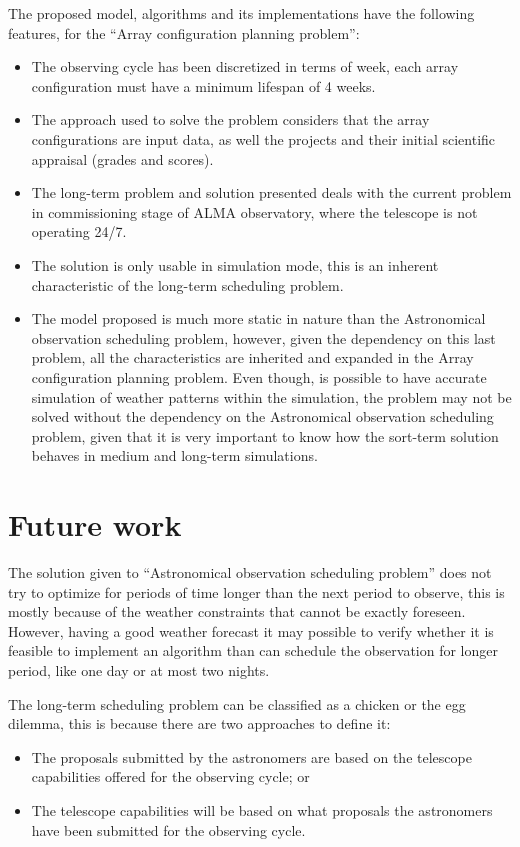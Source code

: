 The proposed model, algorithms and its implementations have the following features, for the ``Array configuration planning problem'':
\begin{itemize}
\item The observing cycle has been discretized in terms of week, each array configuration must have a minimum lifespan of 4 weeks.

\item The approach used to solve the problem considers that the array configurations are input data, as well the projects and their initial scientific appraisal (grades and scores).

\item The long-term problem and solution presented deals with the current problem in commissioning stage of ALMA observatory, where the telescope is not operating 24/7.

\item The solution is only usable in simulation mode, this is an inherent characteristic of the long-term scheduling problem.

\item The model proposed is much more static in nature than the Astronomical observation scheduling problem, however, given the dependency on this last problem, all the characteristics are inherited and expanded in the Array configuration planning problem. Even though, is possible to have accurate simulation of weather patterns within the simulation, the problem may not be solved without the dependency on the Astronomical observation scheduling problem, given that it is very important to know how the sort-term solution behaves in medium and long-term simulations.

\end{itemize}

\section{Future work}
The solution given to ``Astronomical observation scheduling problem'' does not try to optimize for periods of time longer than the next period to observe, this is mostly because of the weather constraints that cannot be exactly foreseen. However, having a good weather forecast it may possible to verify whether it is feasible to implement an algorithm than can schedule the observation for longer period, like one day or at most two nights.

The long-term scheduling problem can be classified as a chicken or the egg dilemma, this is because there are two approaches to define it:
\begin{itemize}
\item The proposals submitted by the astronomers are based on the telescope capabilities offered for the observing cycle; or
\item The telescope capabilities will be based on what proposals the astronomers have been submitted for the observing cycle.
\end{itemize}


